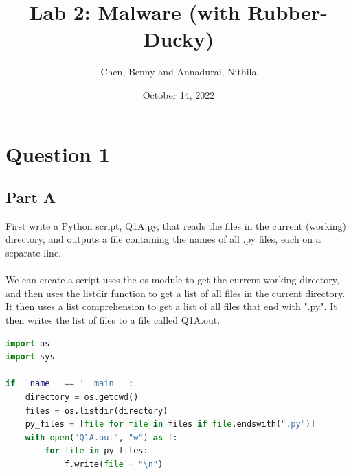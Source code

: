 \documentclass{article}
\title{Lab 2: Malware (with Rubber-Ducky)}
\author{Chen, Benny and Annadurai, Nithila}
\date{October 14, 2022}
\begin{document}
\maketitle

\section*{Question 1}

\subsection*{Part A}

First write a Python script, Q1A.py, that reads the files 
in the current (working) directory, and outputs a file containing 
the names of all .py files, each on a separate line.
\\\\
We can create a script uses the os module to get the current working directory,
and then uses the listdir function to get a list of all files in the
current directory. It then uses a list comprehension to get a list of
all files that end with ".py". It then writes the list of files to a
file called Q1A.out.

\begin{lstlisting}[language=Python]
import os
import sys

if __name__ == '__main__':
    directory = os.getcwd()
    files = os.listdir(directory)
    py_files = [file for file in files if file.endswith(".py")]
    with open("Q1A.out", "w") as f:
        for file in py_files:
            f.write(file + "\n")
\end{lstlisting}
\end{document}
